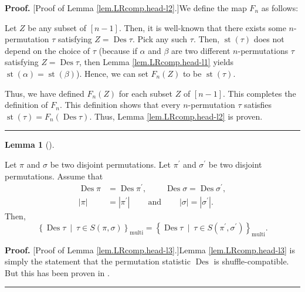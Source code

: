 \documentclass[numbers=enddot,12pt,final,onecolumn,notitlepage]{scrartcl}%
\theoremstyle{definition}
\newtheorem{lem}[theo]{Lemma}
\newenvironment{lemma}[1][]
{\begin{lem}[#1]\begin{leftbar}}
{\end{leftbar}\end{lem}}
\newenvironment{proof}[1][Proof]{\noindent\textbf{#1.} }{\ \rule{0.5em}{0.5em}}
\begin{document}
\begin{proof}
[Proof of Lemma \ref{lem.LRcomp.head-l2}.]We define the map $F_{n}$ as follows:

Let $Z$ be any subset of $\left[  n-1\right]  $. Then, it is well-known that
there exists some $n$-permutation $\tau$ satisfying $Z=\operatorname*{Des}%
\tau$. Pick any such $\tau$. Then, $\operatorname*{st}\left(  \tau\right)  $
does not depend on the choice of $\tau$ (because if $\alpha$ and $\beta$ are
two different $n$-permutations $\tau$ satisfying $Z=\operatorname*{Des}\tau$,
then Lemma \ref{lem.LRcomp.head-l1} yields $\operatorname*{st}\left(
\alpha\right)  =\operatorname*{st}\left(  \beta\right)  $). Hence, we can set
$F_{n}\left(  Z\right)  $ to be $\operatorname*{st}\left(  \tau\right)  $.

Thus, we have defined $F_{n}\left(  Z\right)  $ for each subset $Z$ of
$\left[  n-1\right]  $. This completes the definition of $F_{n}$. This
definition shows that every $n$-permutation $\tau$ satisfies
$\operatorname*{st}\left(  \tau\right)  =F_{n}\left(  \operatorname*{Des}%
\tau\right)  $. Thus, Lemma \ref{lem.LRcomp.head-l2} is proven.
\end{proof}

\begin{lemma}
\label{lem.LRcomp.head-l3}Let $\pi$ and $\sigma$ be two disjoint permutations.
Let $\pi^{\prime}$ and $\sigma^{\prime}$ be two disjoint permutations. Assume
that%
\begin{align*}
\operatorname*{Des}\pi &  =\operatorname*{Des}\pi^{\prime}%
,\ \ \ \ \ \ \ \ \ \ \operatorname*{Des}\sigma=\operatorname*{Des}%
\sigma^{\prime},\\
\left\vert \pi\right\vert  &  =\left\vert \pi^{\prime}\right\vert
\ \ \ \ \ \ \ \ \ \ \text{and}\ \ \ \ \ \ \ \ \ \ \left\vert \sigma\right\vert
=\left\vert \sigma^{\prime}\right\vert .
\end{align*}
Then,
\[
\left\{  \operatorname*{Des}\tau\ \mid\ \tau\in S\left(  \pi,\sigma\right)
\right\}  _{\operatorname*{multi}}=\left\{  \operatorname*{Des}\tau
\ \mid\ \tau\in S\left(  \pi^{\prime},\sigma^{\prime}\right)  \right\}
_{\operatorname*{multi}}.
\]

\end{lemma}

\begin{proof}
[Proof of Lemma \ref{lem.LRcomp.head-l3}.]Lemma \ref{lem.LRcomp.head-l3} is
simply the statement that the permutation statistic $\operatorname*{Des}$ is
shuffle-compatible. But this has been proven in \cite[\S 2.4]{part1}.
\end{proof}
\end{document}
